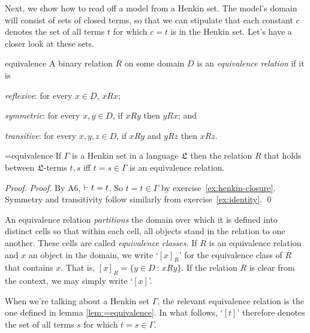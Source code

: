 Next,
we show how to read off a model from a Henkin set.
The model's domain will consist of sets of closed terms,
so that we can stipulate that
each constant $c$ denotes the set of all terms $t$ for which $c=t$ is in the Henkin set.
Let's have a closer look at these sets.

\begin{definition}{}{equivalence}
  A binary relation $R$ on some domain $D$ is an \emph{equivalence relation} if it is
  \begin{cenumerate}
    \item[(i)] \emph{reflexive}: for every $x \in D$, $x R x$;
    \item[(ii)] \emph{symmetric}: for every $x, y \in D$, if $x R y$ then $y R x$; and
    \item[(iii)] \emph{transitive}: for every $x, y, z \in D$, if $x R y$ and $y R z$ then $x R z$.
  \end{cenumerate}
\end{definition}

\begin{lemma}{}{=equivalence}
  If $\Gamma$ is a Henkin set in a language $\mathfrak{L}$ then
  the relation $R$ that holds between $\mathfrak{L}$-terms $t,s$ iff $t=s \in \Gamma$ is an equivalence relation.
\end{lemma}
\begin{proof}
  \emph{Proof.}
  By A6, $\vdash t=t$.
  So $t=t \in \Gamma$ by exercise~\ref{ex:henkin-closure}.
  Symmetry and transitivity follow similarly from exercise~\ref{ex:identity}.
  \qed
\end{proof}

\begin{figure}
  \centering
  \scalebox{0.55}{
  
  }
\end{figure}

An equivalence relation \emph{partitions} the domain over which it is defined into distinct cells so that
within each cell,
all objects stand in the relation to one another.
These cells are called \emph{equivalence classes}.
If $R$ is an equivalence relation and $x$ an object in the domain,
we write `$[x]_{R}$' for the equivalence class of $R$ that contains $x$.
That is, $[x]_{R} = \{ y \in D \,:\, x R y \}$.
If the relation $R$ is clear from the context,
we may simply write `$[x]$'.

When we're talking about a Henkin set $\Gamma$,
the relevant equivalence relation is the one defined in lemma \ref{lem:=equivalence}.
In what follows,
`$[t]$' therefore denotes the set of all terms $s$ for which $t=s \in \Gamma$.

